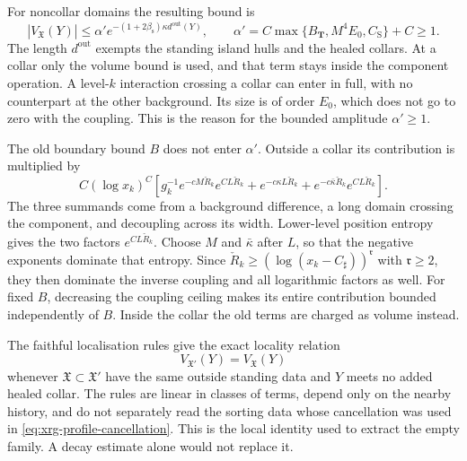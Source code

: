 \documentclass[11pt,letterpaper,reqno]{amsart}
\theoremstyle{definition}
\theoremstyle{remark}
\begin{document}
For noncollar domains the resulting
bound is
\begin{equation}\label{eq:xrg-completion-bound}
 |V_{\mathfrak X}(Y)|
       \le\alpha'e^{-(1+2\beta_{\mathrm s})\kappa
                                              d^{\mathrm{out}}(Y)},
 \qquad
 \alpha'=C\max\{B_{\mathbf T},M^4E_0,C_{\mathrm S}\}+C\ge1.
\end{equation}
The length $d^{\mathrm{out}}$ exempts
the standing island hulls and the
healed collars. At a collar only the
volume bound is used, and that term
stays inside the component operation.
A level-$k$ interaction crossing a
collar can enter in full, with no
counterpart at the other background.
Its size is of order $E_0$, which
does not go to zero with the coupling.
This is the reason for the bounded
amplitude $\alpha'\ge1$.

The old boundary bound $B$ does not
enter $\alpha'$. Outside a collar its
contribution is multiplied by
\begin{equation}\label{eq:xrg-old-boundary-smallness}
 C(\log x_k)^C\left[
 g_k^{-1}e^{-cM\check R_k}e^{CL\check R_k}
 +e^{-c\kappa L\check R_k}
 +e^{-c\bar\kappa\check R_k}e^{CL\check R_k}\right].
\end{equation}
The three summands come from a
background difference, a long domain
crossing the component, and decoupling
across its width. Lower-level position
entropy gives the two factors
$e^{CL\check R_k}$.
Choose $M$ and $\bar\kappa$ after
$L$, so that the negative exponents
dominate that entropy. Since
$\check R_k\ge(\log(x_k-C_\sharp))^{\mathfrak r}$
with $\mathfrak r\ge2$, they then
dominate the inverse coupling and
all logarithmic factors as well.
For fixed $B$, decreasing the
coupling ceiling makes its entire
contribution bounded independently
of $B$. Inside the collar the old
terms are charged as volume instead.

The faithful localisation rules give
the exact locality relation
\begin{equation}\label{eq:xrg-healed-locality}
 V_{\mathfrak X'}(Y)=V_{\mathfrak X}(Y)
\end{equation}
whenever $\mathfrak X\subset\mathfrak X'$
have the same outside standing data
and $Y$ meets no added healed collar.
The rules are linear in classes of
terms, depend only on the nearby
history, and do not separately read
the sorting data whose cancellation
was used in
\eqref{eq:xrg-profile-cancellation}.
This is the local identity used to
extract the empty family. A decay
estimate alone would not replace it.
\end{document}
